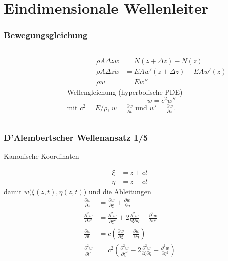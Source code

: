 \documentclass[hyperref={pdfpagemode=FullScreen, colorlinks=false}]{beamer}
\begin{document}
\maketitle



\section{Eindimensionale Wellenleiter}

\begin{frame}
 \frametitle{Bewegungsgleichung}
 \begin{columns}
        \begin{column}[t]{.5\linewidth}
 
 \end{column}
        \begin{column}[t]{.5\linewidth}
        \vspace{-5cm}
        \begin{align*}
         \rho A \Delta z \ddot{w}&=N(z+\Delta z) - N(z)  \\
         \rho A \Delta z \ddot{w}&=EAw'(z+\Delta z) - EAw'(z)  \\
         \rho \ddot{w}&=Ew''  
        \end{align*}
        Wellengleichung (hyperbolische PDE)
        \begin{equation*}
         \ddot{w}=c^2 w''
        \end{equation*}
        mit $c^2=E/\rho$, $\dot{w}=\frac{\partial w}{\partial t}$ und $w'=\frac{\partial w}{\partial z}$.
        \end{column}
        
 \end{columns}
\end{frame}


\begin{frame}
\frametitle{D'Alembertscher Wellenansatz 1/5}
Kanonische Koordinaten 
\hfill 

\begin{align*}
 \xi &= z+ct \\
 \eta &= z-ct 
\end{align*}
damit $w\bigl( \xi(z,t), \eta(z,t) \bigr)$ und die Ableitungen
\begin{align*}
\frac{\partial w}{\partial z} &= \frac{\partial w}{\partial \xi} + \frac{\partial w}{\partial \eta} \\
\frac{\partial^2 w}{\partial z^2} &= \frac{\partial^2 w}{\partial \xi^2} +
2\frac{\partial^2 w}{\partial \xi \partial \eta} + \frac{\partial^2 w}{\partial \eta^2} \\
\frac{\partial w}{\partial t} &=c\left( \frac{\partial w}{\partial \xi} - \frac{\partial w}{\partial \eta}\right) \\
\frac{\partial^2 w}{\partial t^2} &= c^2\left( \frac{\partial^2 w}{\partial \xi^2} -2\frac{\partial^2 w}{\partial \xi \partial \eta} + \frac{\partial^2 w}{\partial \eta^2}\right)
\end{align*}
\end{frame}
\end{document}
